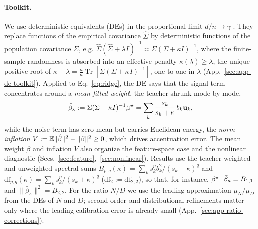 \paragraph{Toolkit.}
We use deterministic equivalents (DEs) in the proportional limit $d/n\to\gamma$ \citep{dobriban2018high,hastie2022surprises}. They replace functions of the empirical covariance $\hat\Sigma$ by deterministic functions of the population covariance $\Sigma$, e.g. $\hat\Sigma(\hat\Sigma+\lambda I)^{-1}\asymp\Sigma(\Sigma+\kappa I)^{-1}$, where the finite-sample randomness is absorbed into an effective penalty $\kappa(\lambda)\ge\lambda$, the unique positive root of $\kappa-\lambda=\frac{\kappa}{n}\operatorname{Tr}[\Sigma(\Sigma+\kappa I)^{-1}]$, one-to-one in $\lambda$ (App.~\ref{sec:app-de-toolkit}).
Applied to Eq.~\ref{eq:ridge}, the DE says that the signal term concentrates around a \emph{mean fitted weight}, the teacher shrunk mode by mode,
\begin{equation}
\bar\beta_\kappa:=\Sigma(\Sigma+\kappa I)^{-1}{\beta^{\star}}=\sum_k\frac{s_k}{s_k+\kappa}\,b_k{\mathbf{u}}_k ,
\label{eq:pixel-mean-weight}
\end{equation}
while the noise term has zero mean but carries Euclidean energy, the \emph{norm inflation} $V:=\mathbb{E}\|\hat{\beta}\|^2-\|\bar\beta\|^2\ge0$, which drives accentuation error. The mean weight $\bar\beta$ and inflation $V$ also organize the feature-space case and the nonlinear diagnostic (Secs.~\ref{sec:feature},~\ref{sec:nonlinear}). Results use the teacher-weighted and unweighted spectral sums $B_{p,q}(\kappa)=\sum_ks_k^pb_k^2/(s_k+\kappa)^q$ and $\mathrm{df}_{p,q}(\kappa)=\sum_ks_k^p/(s_k+\kappa)^q$ ($\mathrm{df}_2:=\mathrm{df}_{2,2}$), so that, for instance, ${\beta^{\star}}^\top\bar\beta_\kappa=B_{1,1}$ and $\|\bar\beta_\kappa\|^2=B_{2,2}$.
For the ratio $N/D$ we use the leading approximation $\mu_N/\mu_D$ from the DEs of $N$ and $D$; second-order and distributional refinements matter only where the leading calibration error is already small (App.~\ref{sec:app-ratio-corrections}).

